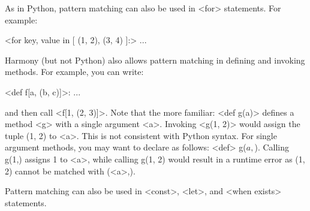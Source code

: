 \documentclass{report}
\newenvironment{code}{
\tcolorbox
}{
\endtcolorbox
}
\begin{document}
As in Python, pattern matching can also be used in <{for}> statements.
For example:
\begin{code}
<{for key, value in [ (1, 2), (3, 4) ]:}>
    ...
\end{code}

Harmony (but not Python)
also allows pattern matching in defining and invoking methods.
For example, you can write:
\begin{code}
<{def f[a, (b, c)]}>: ...
\end{code}
and then call <{f[1, (2, 3)]}>.
Note that the more familiar: <{def g(a)}> defines a method <{g}> with
a single argument <{a}>.  Invoking <{g(1, 2)}> would assign the tuple (1, 2) to
<{a}>.  This is not consistent with Python syntax.  For single argument methods,
you may want to declare as follows: <{def}> g($a,$).
Calling g(1,) assigns 1 to <{a}>, while calling g(1, 2) would result in a
runtime error as (1, 2) cannot be matched with (<{a}>,).

Pattern matching can also be used in <{const}>, <{let}>,
and <{when exists}> statements.
\end{document}

